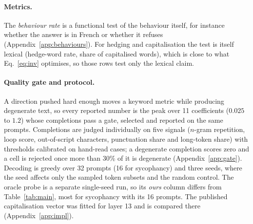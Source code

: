 \documentclass{article}
\begin{document}
\paragraph{Metrics.}
The \emph{behaviour rate} is a functional test of the behaviour itself, for instance whether the answer is in French or whether it refuses (Appendix~\ref{app:behaviours}). For hedging and capitalisation the test is itself lexical (hedge-word rate, share of capitalised words), which is close to what Eq.~\ref{eq:inv} optimises, so those rows test only the lexical claim.

\paragraph{Quality gate and protocol.}
A direction pushed hard enough moves a keyword metric while producing degenerate text, so every reported number is the peak over 11 coefficients ($0.025$ to $1.2$) whose completions pass a gate, selected and reported on the same prompts. Completions are judged individually on five signals ($n$-gram repetition, loop score, out-of-script characters, punctuation share and long-token share) with thresholds calibrated on hand-read cases; a degenerate completion scores zero and a cell is rejected once more than 30\% of it is degenerate (Appendix~\ref{app:gate}). Decoding is greedy over 32 prompts (16 for sycophancy) and three seeds, where the seed affects only the sampled token subsets and the random control. The oracle probe is a separate single-seed run, so its \emph{ours} column differs from Table~\ref{tab:main}, most for sycophancy with its 16 prompts. The published capitalisation vector was fitted for layer 13 and is compared there (Appendix~\ref{app:impl}).
\end{document}
